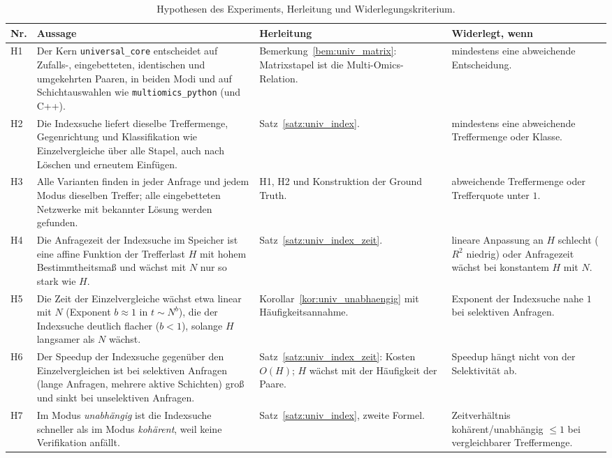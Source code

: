 \begin{table}[!ht]
	\centering
	\small
	\caption{Hypothesen des Experiments, Herleitung und Widerlegungskriterium.}
	\label{tab:ucx_hypothesen}
	\begin{tabular}{@{}>{\raggedright\arraybackslash}p{0.9cm}>{\raggedright\arraybackslash}p{5.6cm}>{\raggedright\arraybackslash}p{3.6cm}>{\raggedright\arraybackslash}p{4.2cm}@{}}
		\toprule
		Nr. & Aussage & Herleitung & Widerlegt, wenn \\
		\midrule
		H1 & Der Kern \texttt{universal\_core} entscheidet auf Zufalls-, eingebetteten, identischen und umgekehrten Paaren, in beiden Modi und auf Schichtauswahlen wie \texttt{multiomics\_python} (und C++). & Bemerkung~\ref{bem:univ_matrix}: Matrixstapel ist die Multi-Omics-Relation. & mindestens eine abweichende Entscheidung. \\
		H2 & Die Indexsuche liefert dieselbe Treffermenge, Gegenrichtung und Klassifikation wie Einzelvergleiche über alle Stapel, auch nach Löschen und erneutem Einfügen. & Satz~\ref{satz:univ_index}. & mindestens eine abweichende Treffermenge oder Klasse. \\
		H3 & Alle Varianten finden in jeder Anfrage und jedem Modus dieselben Treffer; alle eingebetteten Netzwerke mit bekannter Lösung werden gefunden. & H1, H2 und Konstruktion der Ground Truth. & abweichende Treffermenge oder Trefferquote unter $1$. \\
		H4 & Die Anfragezeit der Indexsuche im Speicher ist eine affine Funktion der Trefferlast $H$ mit hohem Bestimmtheitsmaß und wächst mit $N$ nur so stark wie $H$. & Satz~\ref{satz:univ_index_zeit}. & lineare Anpassung an $H$ schlecht ($R^2$ niedrig) oder Anfragezeit wächst bei konstantem $H$ mit $N$. \\
		H5 & Die Zeit der Einzelvergleiche wächst etwa linear mit $N$ (Exponent $b\approx1$ in $t\sim N^b$), die der Indexsuche deutlich flacher ($b<1$), solange $H$ langsamer als $N$ wächst. & Korollar~\ref{kor:univ_unabhaengig} mit Häufigkeitsannahme. & Exponent der Indexsuche nahe $1$ bei selektiven Anfragen. \\
		H6 & Der Speedup der Indexsuche gegenüber den Einzelvergleichen ist bei selektiven Anfragen (lange Anfragen, mehrere aktive Schichten) groß und sinkt bei unselektiven Anfragen. & Satz~\ref{satz:univ_index_zeit}: Kosten $O(H)$; $H$ wächst mit der Häufigkeit der Paare. & Speedup hängt nicht von der Selektivität ab. \\
		H7 & Im Modus \emph{unabhängig} ist die Indexsuche schneller als im Modus \emph{kohärent}, weil keine Verifikation anfällt. & Satz~\ref{satz:univ_index}, zweite Formel. & Zeitverhältnis kohärent/unabhängig $\le1$ bei vergleichbarer Treffermenge. \\

\end{tabular}
\end{table}
